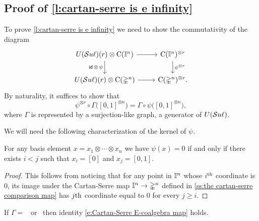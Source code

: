 
\subsection{Proof of \cref{l:cartan-serre is e infinity}} \label{ss:comparison proof}

To prove \cref{l:cartan-serre is e infinity} we need to show the commutativity of the diagram
\[
\begin{tikzcd}
U(\Sl)(r) \otimes \gchains(\gcube^n) \arrow[r] \arrow[d, "\id\, \otimes\, \psi"'] &
\gchains(\gcube^n)^{\otimes r} \arrow[d, "\psi^{\otimes r}"] \\
U(\Sl)(r) \otimes \gchains(\gsimplex^n) \arrow[r] &
\gchains(\gsimplex^n)^{\otimes r}.
\end{tikzcd}
\]
By naturality, it suffices to show that
\begin{equation} \label{e:Cartan-Serre E-coalgebra map}
\psi^{\otimes r} \circ \Gamma\big( [0,1]^{\otimes n} \big) = \Gamma \circ \psi \big( [0,1]^{\otimes n} \big),
\end{equation}
where $\Gamma$ is represented by a surjection-like graph, a generator of $U(\mathcal{S}u\ell)$.

We will need the following characterization of the kernel of $\psi$.
\begin{lemma} \label{l:kernel of psi}
	For any basis element $x = x_1 \otimes \cdots \otimes x_n$ we have $\psi(x) = 0$ if and only if there exists $i < j$ such that $x_i = [0]$ and $x_j = [0,1]$.
\end{lemma}

\begin{proof}
	This follows from noticing that for any point in $\mathbb{I}^n$ whose $i^{\mathrm{th}}$ coordinate is $0$, its image under the Cartan-Serre map $\mathbb{I}^n \to \mathbb{\Delta}^n$ defined in \cref{ss:the cartan-serre comparison map} has $j\mathrm{th}$ coordinate equal to $0$ for every $j \geq i$.
\end{proof}

\begin{lemma}
	If $\Gamma =$ \counit \ or \coproduct \ then identity \eqref{e:Cartan-Serre E-coalgebra map} holds.
\end{lemma}

